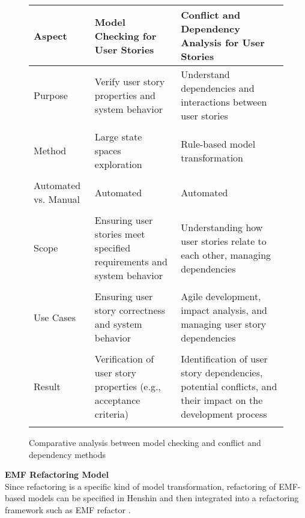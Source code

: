 \begin{figure}
\begingroup
\footnotesize
\centering
\begin{tabularx}{\textwidth}{l  X  X}
\hline
Aspect	&Model Checking for User Stories &	Conflict and Dependency Analysis for User Stories \\
\hline\hline
Purpose	&Verify user story properties and system behavior	&Understand dependencies and interactions between user stories \\\\ 
Method&	Large state spaces exploration&	Rule-based model transformation\\\\ 
Automated vs. Manual&	Automated	&Automated\\\\ 
Scope&	Ensuring user stories meet specified requirements and system behavior	&Understanding how user stories relate to each other, managing dependencies\\\\ 
Use Cases&	Ensuring user story correctness and system behavior	&Agile development, impact analysis, and managing user story dependencies\\\\ 
Result	&Verification of user story properties (e.g., acceptance criteria)	&Identification of user story dependencies, potential conflicts, and their impact on the development process\\\\ 
\hline
\end{tabularx}
\begin{TableCaption}
\caption{Comparative analysis between model checking and conflict and dependency methods}\label{tb:sec_6_comparative_analysis}
\end{TableCaption}
\endgroup
\end{figure}
\textbf{EMF Refactoring Model}\\ 
Since refactoring is a specific kind of model transformation, refactoring of EMF-based models can be specified in Henshin and then integrated into a refactoring framework such as EMF refactor \cite{arendt2013tool}.

